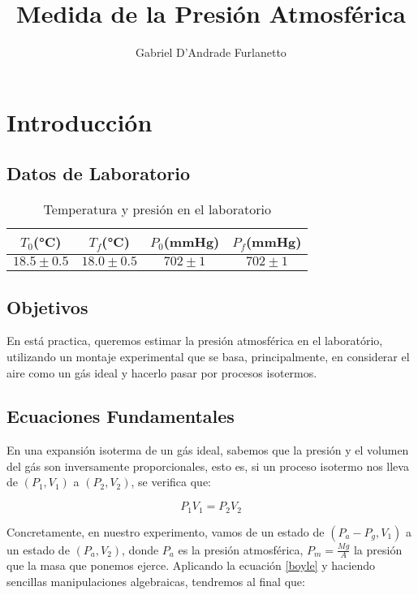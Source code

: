 \documentclass[a4paper,12pt]{article}
\begin{document}
\title{Medida de la Presión Atmosférica}
\author{Gabriel D'Andrade Furlanetto}
\maketitle

\section{Introducción}
\subsection{Datos de Laboratorio}
\begin{table}[h!]
  \centering
  \caption{Temperatura y presión en el laboratorio}
  \begin{tabular}{|c|c|c|c|}
  \hline
    $T_0$(°C) & $T_f$(°C) & $P_0$(mmHg) & $P_f$(mmHg) \\ 
    \hline
    $18.5 \pm 0.5$&$18.0\pm 0.5$ & $702 \pm 1$&$ 702 \pm 1$ \\ 
    \hline 
  \end{tabular}
\end{table}
\subsection{Objetivos}
En está practica, queremos estimar la presión atmosférica en el laboratório, utilizando un montaje experimental que se basa, principalmente, en considerar el aire como un gás ideal y hacerlo pasar por procesos isotermos.

\subsection{Ecuaciones Fundamentales}
En una expansión isoterma de un gás ideal, sabemos que la presión y el volumen del gás son inversamente proporcionales, esto es, si un proceso isotermo nos lleva de $(P_1,V_1)$ a $(P_2,V_2)$, se verifica que:

\begin{equation}
  \label{boyle}
  P_1V_1 = P_2 V_2
\end{equation}

Concretamente, en nuestro experimento, vamos de un estado de $(P_a - P_g, V_1)$ a un estado de $(P_a,V_2)$, donde $P_a$ es la presión atmosférica, $P_m = \frac{Mg}{A}$ la presión que la masa que ponemos ejerce. Aplicando la ecuación \eqref{boyle} y haciendo sencillas manipulaciones algebraicas, tendremos al final que:
\end{document}
